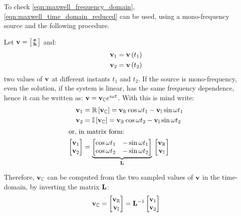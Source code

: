 To check \eqref{eqn:maxwell_frequency_domain},
\eqref{eqn:maxwell_time_domain_reduced} can be used, using a
mono-frequency source and the following procedure.

Let $\mathbf{v} = \bigl[ \begin{smallmatrix} \mathbf{e} \\ \mathbf{h}
  \end{smallmatrix} \bigr]$ and:
\begin{align*}
  \mathbf{v}_1 & = \mathbf{v}\left(t_1\right) \\
  \mathbf{v}_2 & = \mathbf{v}\left(t_2\right)
\end{align*}
two values of $\mathbf{v}$ at different instants $t_1$ and $t_2$. If
the source is mono-frequency, even the solution, if the system is
linear, has the same frequency dependence, hence it can be written as:
$\mathbf{v} = \mathbf{v}_{\mathbb{C}} e^{\imath \omega t}$. With this is
mind write:
\begin{align*}
  \mathbf{v}_1 & = {\mathbb{R}\left[\mathbf{v}_{\mathbb{C}}\right]} = \mathbf{v}_{\mathbb{R}}
  \cos \omega t_1 - \mathbf{v}_{\mathbb{I}} \sin \omega t_1 \\
  \mathbf{v}_2 & = {\mathbb{I}\left[\mathbf{v}_{\mathbb{C}}\right]} = \mathbf{v}_{\mathbb{R}}
  \cos \omega t_2 - \mathbf{v}_{\mathbb{I}} \sin \omega t_2 \\
  \intertext{or, in matrix form:}
  \begin{bmatrix} \mathbf{v}_1 \\ \mathbf{v}_2 \end{bmatrix} & = {
    \underbrace{ \begin{bmatrix}
	\cos \omega t_1 & -\sin \omega t_1 \\
	\cos \omega t_2 & -\sin \omega t_2
      \end{bmatrix} }_{\mathbf{L}}
  \,\begin{bmatrix} \mathbf{v}_{\mathbb{R}} \\ \mathbf{v}_{\mathbb{I}} \end{bmatrix}}
\end{align*}

Therefore, $\mathbf{v}_{\mathbb{C}}$ can be computed from the two
sampled values of $\mathbf{v}$ in the time-domain, by inverting the
matrix $\mathbf{L}$:
\begin{equation*}
  \mathbf{v}_{\mathbb{C}} = \begin{bmatrix} \mathbf{v}_{\mathbb{R}} \\ \mathbf{v}_{\mathbb{I}}
  \end{bmatrix} = \mathbf{L}^{-1} \begin{bmatrix} \mathbf{v}_1 \\
    \mathbf{v}_2 \end{bmatrix}
\end{equation*}

